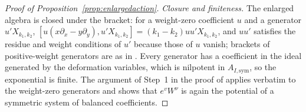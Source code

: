\documentclass[11pt]{amsart}
\theoremstyle{definition}
\theoremstyle{remark}
\begin{document}
\begin{proof}[Proof of Proposition~\ref{prop:enlargedaction}]
\emph{Closure and finiteness.}  The enlarged algebra is closed under the
bracket: for a weight-zero coefficient $u$ and a generator $u'X_{k_1,k_2}$,
$[u(x\partial_x-y\partial_y),u'X_{k_1,k_2}]=(k_1-k_2)uu'X_{k_1,k_2}$, and
$uu'$ satisfies the residue and weight conditions of $u'$ because those of
$u$ vanish; brackets of positive-weight generators are as in
\cite[Prop.~4.25]{GKT}.  Every generator has a coefficient in the ideal
generated by the deformation variables, which is nilpotent in
$A_{I,\mathrm{sym}}$, so the exponential is finite.  The argument of Step~1
in the proof of \cite[Thm.~4.27]{GKT} applies verbatim to the weight-zero
generators and shows that $e^vW^\nu$ is again the potential of a symmetric
system of balanced coefficients.


\end{proof}
\end{document}
